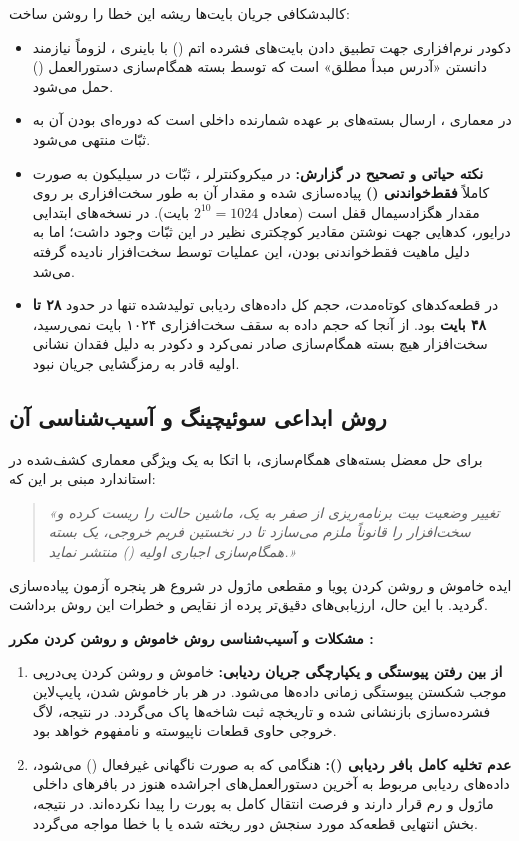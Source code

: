 کالبدشکافی جریان بایت‌ها ریشه این خطا را روشن ساخت:
\begin{itemize}
    \item دکودر نرم‌افزاری جهت تطبیق دادن بایت‌های فشرده اتم () با باینری ، لزوماً نیازمند دانستن «آدرس مبدأ مطلق» است که توسط بسته همگام‌سازی دستورالعمل () حمل می‌شود.
    \item در معماری ، ارسال بسته‌های  بر عهده شمارنده داخلی است که دوره‌ای بودن آن به ثبّات  منتهی می‌شود.
    \item \textbf{نکته حیاتی و تصحیح در گزارش:} در میکروکنترلر ، ثبّات  در سیلیکون به صورت کاملاً \textbf{فقط‌خواندنی ()} پیاده‌سازی شده و مقدار آن به طور سخت‌افزاری بر روی مقدار هگزادسیمال  قفل است (معادل $2^{10} = 1024$ بایت). در نسخه‌های ابتدایی درایور، کدهایی جهت نوشتن مقادیر کوچکتری نظیر  در این ثبّات وجود داشت؛ اما به دلیل ماهیت فقط‌خواندنی بودن، این عملیات توسط سخت‌افزار نادیده گرفته می‌شد.
    \item در قطعه‌کدهای کوتاه‌مدت، حجم کل داده‌های ردیابی تولیدشده تنها در حدود \textbf{۲۸ تا ۴۸ بایت} بود. از آنجا که حجم داده به سقف سخت‌افزاری ۱۰۲۴ بایت نمی‌رسید، سخت‌افزار هیچ بسته همگام‌سازی صادر نمی‌کرد و دکودر به دلیل فقدان نشانی اولیه قادر به رمزگشایی جریان نبود.
\end{itemize}

\subsection{روش ابداعی سوئیچینگ  و آسیب‌شناسی آن}
\label{subsec:switching_drawbacks}
برای حل معضل بسته‌های همگام‌سازی، با اتکا به یک ویژگی معماری کشف‌شده در استاندارد  مبنی بر این که:
\begin{quote}
\textit{«تغییر وضعیت بیت برنامه‌ریزی  از صفر به یک، ماشین حالت  را ریست کرده و سخت‌افزار را قانوناً ملزم می‌سازد تا در نخستین فریم خروجی، یک بسته همگام‌سازی اجباری اولیه () منتشر نماید.»}
\end{quote}
ایده خاموش و روشن کردن پویا و مقطعی ماژول  در شروع هر پنجره آزمون پیاده‌سازی گردید. با این حال، ارزیابی‌های دقیق‌تر پرده از نقایص و خطرات این روش برداشت.

\textbf{مشکلات و آسیب‌شناسی روش خاموش و روشن کردن مکرر :}
\begin{enumerate}
    \item \textbf{از بین رفتن پیوستگی و یکپارچگی جریان ردیابی:} خاموش و روشن کردن پی‌درپی  موجب شکستن پیوستگی زمانی داده‌ها می‌شود. در هر بار خاموش شدن، پایپ‌لاین فشرده‌سازی بازنشانی شده و تاریخچه ثبت شاخه‌ها پاک می‌گردد. در نتیجه، لاگ خروجی حاوی قطعات ناپیوسته و نامفهوم خواهد بود.
    \item \textbf{عدم تخلیه کامل بافر ردیابی ():} هنگامی که  به صورت ناگهانی غیرفعال () می‌شود، داده‌های ردیابی مربوط به آخرین دستورالعمل‌های اجراشده هنوز در بافرهای  داخلی ماژول و رم  قرار دارند و فرصت انتقال کامل به پورت  را پیدا نکرده‌اند. در نتیجه، بخش انتهایی قطعه‌کد مورد سنجش دور ریخته شده یا با خطا مواجه می‌گردد.
\end{enumerate}

